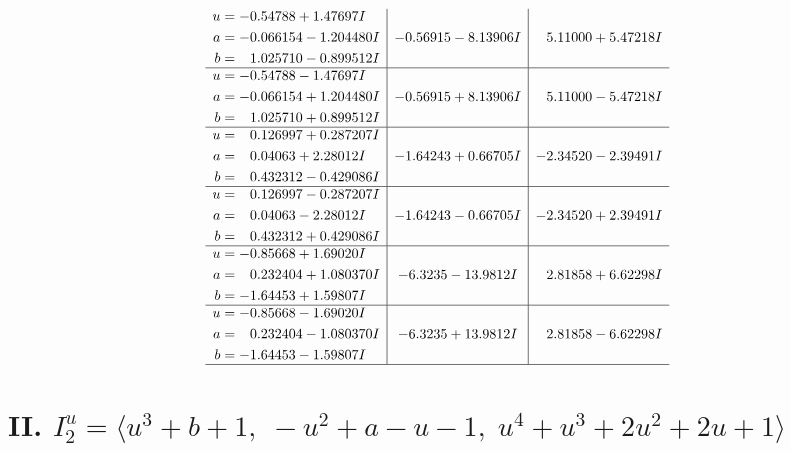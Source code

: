 \documentclass[1p]{elsarticle_modified}
\theoremstyle{definition}
\begin{document}
$$\begin{array}{c|c|c}
\begin{aligned}
u &= -0.54788 + 1.47697 I \\
a &= -0.066154 - 1.204480 I \\
b &= \phantom{-}1.025710 - 0.899512 I\end{aligned}
 & -0.56915 - 8.13906 I & \phantom{-}5.11000 + 5.47218 I \\ \hline\begin{aligned}
u &= -0.54788 - 1.47697 I \\
a &= -0.066154 + 1.204480 I \\
b &= \phantom{-}1.025710 + 0.899512 I\end{aligned}
 & -0.56915 + 8.13906 I & \phantom{-}5.11000 - 5.47218 I \\ \hline\begin{aligned}
u &= \phantom{-}0.126997 + 0.287207 I \\
a &= \phantom{-}0.04063 + 2.28012 I \\
b &= \phantom{-}0.432312 - 0.429086 I\end{aligned}
 & -1.64243 + 0.66705 I & -2.34520 - 2.39491 I \\ \hline\begin{aligned}
u &= \phantom{-}0.126997 - 0.287207 I \\
a &= \phantom{-}0.04063 - 2.28012 I \\
b &= \phantom{-}0.432312 + 0.429086 I\end{aligned}
 & -1.64243 - 0.66705 I & -2.34520 + 2.39491 I \\ \hline\begin{aligned}
u &= -0.85668 + 1.69020 I \\
a &= \phantom{-}0.232404 + 1.080370 I \\
b &= -1.64453 + 1.59807 I\end{aligned}
 & -6.3235 - 13.9812 I & \phantom{-}2.81858 + 6.62298 I \\ \hline\begin{aligned}
u &= -0.85668 - 1.69020 I \\
a &= \phantom{-}0.232404 - 1.080370 I \\
b &= -1.64453 - 1.59807 I\end{aligned}
 & -6.3235 + 13.9812 I & \phantom{-}2.81858 - 6.62298 I\\
 \hline 
 \end{array}$$\newpage\newpage\renewcommand{\arraystretch}{1}
\centering \section*{II. $I^u_{2}= \langle u^3+b+1,\;- u^2+a- u-1,\;u^4+u^3+2 u^2+2 u+1 \rangle$}
\end{document}
